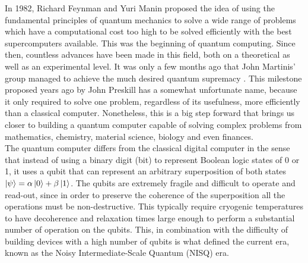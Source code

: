 In 1982, Richard Feynman and Yuri Manin proposed \cite{Feynman1982} the idea of using the fundamental principles of quantum mechanics to solve a wide range of problems which have a computational cost too high to be solved efficiently with the best supercomputers available. This was the beginning of quantum computing. Since then, countless advances have been made in this field, both on a theoretical as well as an experimental level. It was only a few months ago that John Martinis' group managed to achieve the much desired quantum supremacy \cite{Arute2019}. This milestone proposed years ago by John Preskill \cite{Preskill2012} has a somewhat unfortunate name, because it only required to solve one problem, regardless of its usefulness, more efficiently than a classical computer. Nonetheless, this is a big step forward that brings us closer to building a quantum computer capable of solving complex problems from mathematics\cite{Wang2005}, chemistry\cite{ArgueelloLuengo2019}, material science\cite{Itoh2014}, biology\cite{Arndt2009} and even finances\cite{Haven2002}.\\

The quantum computer differs from the classical digital computer in the sense that instead of using a binary digit (bit) to represent Boolean logic states of 0 or 1, it uses a qubit that can represent an arbitrary superposition of both states $\ket{\psi}=\alpha\ket{0} +\beta\ket{1}$. The qubits are extremely fragile and difficult to operate and read-out, since in order to preserve the coherence of the superposition all the operations must be non-destructive. This typically require cryogenic temperatures to have decoherence and relaxation times large enough to perform a substantial number of operation on the qubits. This, in combination with the difficulty of building devices with a high number of qubits is what defined the current era, known as the Noisy Intermediate-Scale Quantum (NISQ) era.\\

